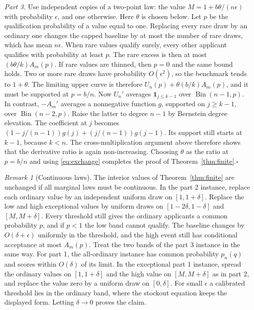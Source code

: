 \documentclass[11pt,a4paper]{article}
\theoremstyle{remark}
\newtheorem{rem}[thm]{Remark}
\newcommand{\Bin}{\operatorname{Bin}}
\begin{document}
\emph{Part 3.} Use independent copies of a two-point law: the value $M=1+b\theta/(n\epsilon)$ with probability $\epsilon$, and one otherwise. Here $\theta$ is chosen below. Let $p$ be the qualification probability of a value equal to one. Replacing every rare draw by an ordinary one changes the capped baseline by at most the number of rare draws, which has mean $n\epsilon$. When rare values qualify surely, every other applicant qualifies with probability at least $p$. The rare excess is then at most $(b\theta/k)A_m(p)$. If rare values are thinned, then $p=0$ and the same bound holds. Two or more rare draws have probability $O(\epsilon^2)$, so the benchmark tends to $1+\theta$. The limiting upper curve is therefore $U_n(p)+\theta(b/k)A_m(p)$, and it must be supported at $p=b/n$. Now $U_n'$ averages $\mathbf1_{j\le k-1}$ over $\Bin(n-1,p)$. In contrast, $-A_m'$ averages a nonnegative function $g$, supported on $j\ge k-1$, over $\Bin(n-2,p)$. Raise the latter to degree $n-1$ by Bernstein degree elevation. The coefficient at $j$ becomes $(1-j/(n-1))g(j)+(j/(n-1))g(j-1)$. Its support still starts at $k-1$, because $k<n$. The cross-multiplication argument above therefore shows that the derivative ratio is again non-increasing. Choosing $\theta$ as the ratio at $p=b/n$ and using \eqref{eq:exchange} completes the proof of Theorem~\ref{thm:finite}.\hfill$\square$

\begin{rem}[Continuous laws]\label{rem:continuous}
The interior values of Theorem~\ref{thm:finite} are unchanged if all marginal laws must be continuous. In the part 2 instance, replace each ordinary value by an independent uniform draw on $[1,1+\delta]$. Replace the low and high exceptional values by uniform draws on $[1-2\delta,1-\delta]$ and $[M,M+\delta]$. Every threshold still gives the ordinary applicants a common probability $p$, and if $p<1$ the low band cannot qualify. The baseline changes by $O(\delta+\epsilon)$ uniformly in the threshold, and the high event still has conditional acceptance at most $A_m(p)$. Treat the two bands of the part 3 instance in the same way. For part 1, the all-ordinary instance has common probability $p_n(q)$ and scores within $O(\delta)$ of its limit. In the exceptional part 1 instance, spread the ordinary values on $[1,1+\delta]$ and the high value on $[M,M+\delta]$ as in part 2, and replace the value zero by a uniform draw on $[0,\delta]$. For small $\epsilon$ a calibrated threshold lies in the ordinary band, where the stockout equation keeps the displayed form. Letting $\delta\to0$ proves the claim.
\end{rem}
\end{document}
